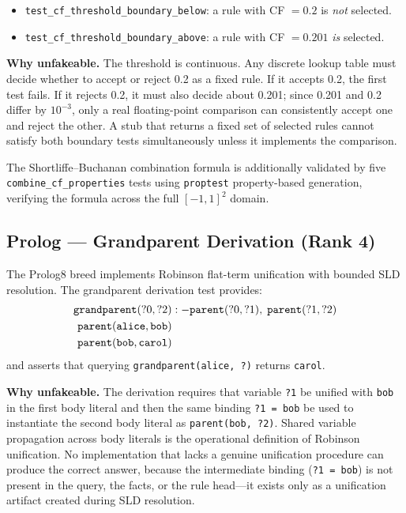 \begin{itemize}
  \item \texttt{test\_cf\_threshold\_boundary\_below}: a rule with CF $= 0.2$ is \emph{not}
    selected.
  \item \texttt{test\_cf\_threshold\_boundary\_above}: a rule with CF $= 0.201$ \emph{is}
    selected.
\end{itemize}

\textbf{Why unfakeable.} The threshold is continuous. Any discrete lookup table must decide
whether to accept or reject 0.2 as a fixed rule. If it accepts 0.2, the first test fails. If
it rejects 0.2, it must also decide about 0.201; since 0.201 and 0.2 differ by $10^{-3}$,
only a real floating-point comparison can consistently accept one and reject the other. A stub
that returns a fixed set of selected rules cannot satisfy both boundary tests simultaneously
unless it implements the comparison.

The Shortliffe--Buchanan combination formula is additionally validated by five
\texttt{combine\_cf\_properties} tests using \texttt{proptest} property-based generation,
verifying the formula across the full $[-1, 1]^2$ domain.

\subsection{Prolog --- Grandparent Derivation (Rank 4)}
\label{subsec:prolog-oracle}

The Prolog8 breed implements Robinson flat-term unification with bounded SLD resolution.
The grandparent derivation test provides:
\begin{align}
  \texttt{grandparent}(?0, ?2) &:- \texttt{parent}(?0, ?1),\; \texttt{parent}(?1, ?2) \notag\\
  \texttt{parent}(\texttt{alice}, \texttt{bob}) &\notag\\
  \texttt{parent}(\texttt{bob}, \texttt{carol}) &\notag
\end{align}
and asserts that querying \texttt{grandparent(alice, ?)} returns \texttt{carol}.

\textbf{Why unfakeable.} The derivation requires that variable \texttt{?1} be unified with
\texttt{bob} in the first body literal and then the same binding \texttt{?1 = bob} be used to
instantiate the second body literal as \texttt{parent(bob, ?2)}. Shared variable propagation
across body literals is the operational definition of Robinson unification. No implementation
that lacks a genuine unification procedure can produce the correct answer, because the
intermediate binding (\texttt{?1 = bob}) is not present in the query, the facts, or the rule
head---it exists only as a unification artifact created during SLD resolution.

